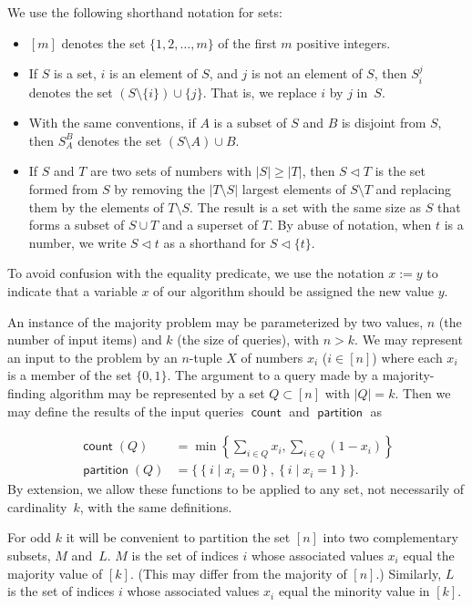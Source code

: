 \documentclass[11pt]{llncs}
\newcommand{\qcount}{\operatorname{\mathsf{count}}}
\newcommand{\qpart}{\operatorname{\mathsf{partition}}}
\newcommand{\inject}{\triangleleft}
\newcommand{\assign}{:=}
\begin{document}
We use the following shorthand notation for sets:
\begin{itemize}
\item $[m]$ denotes the set $\{1,2,\dots, m\}$ of the first $m$ positive integers.
\item If $S$ is a set, $i$ is an element of $S$, and $j$ is not an element of $S$,
then $S_i^j$ denotes the set $(S\setminus\{i\})\cup\{j\}$. That is, we replace $i$ by $j$ in~$S$.
\item With the same conventions, if $A$ is a subset of $S$ and $B$ is disjoint from $S$,
then $S_A^B$ denotes the set $(S\setminus A)\cup B$.
\item If $S$ and $T$ are two sets of numbers with $|S|\ge |T|$, then $S\inject T$ is the set formed from $S$ by removing the $|T\setminus S|$ largest elements of $S\setminus T$ and replacing them by the elements of $T\setminus S$. The result is a set with the same size as $S$ that forms a subset of $S\cup T$ and a superset of $T$.
By abuse of notation, when $t$ is a number, we write $S\inject t$ as a shorthand for $S\inject\{t\}$.
\end{itemize}
To avoid confusion with the equality predicate, we use the notation $x\assign y$ to indicate that a variable $x$ of our algorithm should be assigned the new value $y$.

An instance of the majority problem may be parameterized by two values, $n$ (the number of input items) and $k$ (the size of queries), with $n>k$.
We may represent an input to the problem by an $n$-tuple $X$ of numbers $x_i$ ($i\in[n]$) where each $x_i$ is a member of the set $\{0,1\}$. The argument to a query made by a majority-finding algorithm may be represented by a set $Q\subset [n]$ with $|Q|=k$. Then we may define the results of the input queries $\qcount$ and $\qpart$ as

\begin{align*}
\qcount(Q) &= \min\left\{ \sum_{i\in Q} x_i, \sum_{i\in Q} (1-x_i)\right\}\\
\qpart(Q) &= \bigl\{ \left\{ i \mid x_i = 0 \right\}, \left\{ i \mid x_i = 1 \right\} \bigr\}.
\end{align*}
By extension, we allow these functions to be applied to any set, not necessarily of cardinality~$k$, with the same definitions.

For odd $k$ it will be convenient to partition the set $[n]$ into two complementary subsets, $M$ and~$L$. $M$ is the set of indices $i$ whose associated values $x_i$ equal the majority value of $[k]$. (This may differ from the majority of $[n]$.) Similarly, $L$ is the set of indices $i$ whose associated values $x_i$ equal the minority value in $[k]$.
\end{document}
